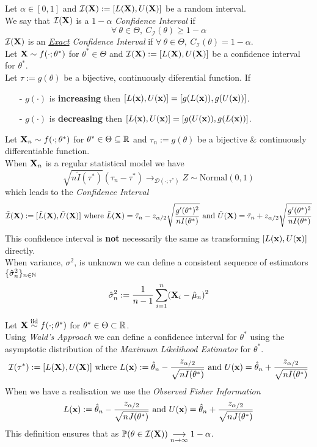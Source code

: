 \documentclass[11pt,a4paper]{article}
\begin{document}
Let $\alpha\in[0,1]$ and $\mathcal{I}(\textbf{X}):=[L(\textbf{X}),U(\textbf{X})]$ be a random interval.\\
We say that $\mathcal{I}(\textbf{X})$ is a $1-\alpha$ \textit{Confidence Interval} if
$$\forall\ \theta\in\Theta,\ C_\mathcal{I}(\theta)\geq1-\alpha$$
\nb $\mathcal{I}(\textbf{X})$ is an \textit{\underline{Exact} Confidence Interval} if $\forall\ \theta\in\Theta,\ C_\mathcal{I}(\theta)=1-\alpha$.\\

Let $\textbf{X}\sim f(\cdot;\theta^*)$ for $\theta^*\in\Theta$ and $\mathcal{I}(\textbf{X}):=[L(\textbf{X}),U(\textbf{X})]$ be a confidence interval for $\theta^*$.\\
Let $\tau:=g(\theta)$ be a bijective, continuously diferential function. If
\begin{itemize}
	\item[-] $g(\cdot)$ is \textbf{increasing} then $[L(\textbf{x}),U(\textbf{x})]=[g(L(\textbf{x})),g(U(\textbf{x}))]$.
	\item[-] $g(\cdot)$ is \textbf{decreasing} then $[L(\textbf{x}),U(\textbf{x})]=[g(U(\textbf{x})),g(L(\textbf{x}))]$.
\end{itemize}

Let $\textbf{X}_n\sim f(\cdot;\theta^*)$ for $\theta^*\in\Theta\subseteq\mathbb{R}$ and $\tau_n:=g(\theta)$ be a bijective \& continuously differentiable function.\\
When $\textbf{X}_n$ is a regular statistical model we have
$$\sqrt{n\tilde{I}(\tau^*)}(\hat\tau_n-\tau^*)\to_{\mathcal{D}(\cdot;\tau^*)}Z\sim\text{Normal}(0,1)$$
which leads to the \textit{Confidence Interval}
$$\tilde{\mathcal{I}}(\textbf{X}):=[\tilde{L}(\textbf{X}),\tilde{U}(\textbf{X})]\text{ where }\tilde{L}(\textbf{X})=\hat\tau_n-z_{\alpha/2}\sqrt{\dfrac{g'(\theta^*)^2}{nI(\theta^*)}}\text{ and }\tilde{U}(\textbf{X})=\hat\tau_n+z_{\alpha/2}\sqrt{\dfrac{g'(\theta^*)^2}{nI(\theta^*)}}$$
\nb This confidence interval is \textbf{not} necessarily the same as transforming $[L(\textbf{x}),U(\textbf{x})]$ directly.\\

When variance, $\sigma^2$, is unknown we can define a consistent sequence of estimators $\{\hat\sigma^2_n\}_{n\in\mathbb{N}}$ 
$$\hat\sigma_n^2:=\frac{1}{n-1}\sum_{i=1}^n(\textbf{X}_i-\hat\mu_n)^2$$

Let $\textbf{X}\overset{\text{iid}}{\sim} f(\cdot;\theta^*)$ for $\theta^*\in\Theta\subset\mathbb{R}$.\\
Using \textit{Wald's Approach} we can define a confidence interval for $\theta^*$ using the asymptotic distribution of the \textit{Maximum Likelihood Estimator} for $\theta^*$.
$$\mathcal{I}(\tau^*):=[L(\textbf{X}),U(\textbf{X})]\text{ where } L(\textbf{x}):=\hat\theta_n-\frac{z_{\alpha/2}}{\sqrt{nI(\theta^*)}}\text{ and }U(\textbf{x})=\hat\theta_n+\frac{z_{\alpha/2}}{\sqrt{nI(\theta^*)}}$$
When we have a realisation we use the \textit{Observed Fisher Information}
$$L(\textbf{x}):=\hat\theta_n-\frac{z_{\alpha/2}}{\sqrt{nJ(\theta^*)}}\text{ and }U(\textbf{x})=\hat\theta_n+\frac{z_{\alpha/2}}{\sqrt{nJ(\theta^*)}}$$
\nb This definition ensures that as $\mathbb{P}(\theta\in\mathcal{I}(\textbf{X}))\underset{n\to\infty}{\longrightarrow}1-\alpha$.\\
\end{document}
